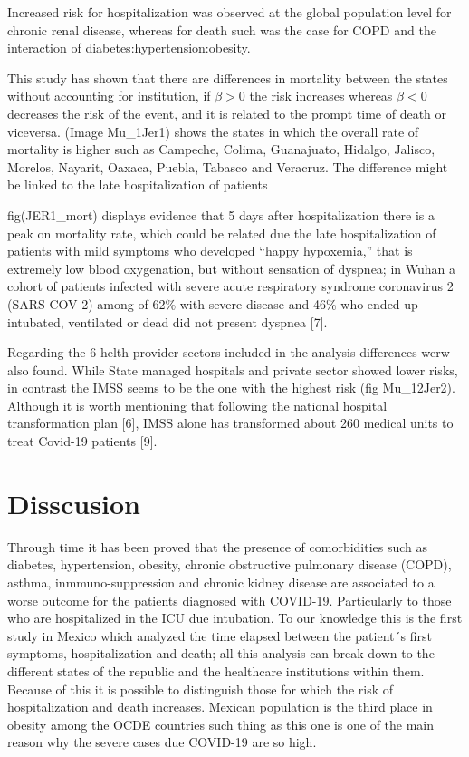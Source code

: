 \documentclass[10pt,letterpaper]{article}
\begin{document}
Increased risk for hospitalization was observed at the global population
level for chronic renal disease, whereas for death such was the case for
COPD and the interaction of diabetes:hypertension:obesity.

This study has shown that there are differences in mortality between the
states without accounting for institution, if \(\beta>0\) the risk
increases whereas \(\beta<0\) decreases the risk of the event, and it is
related to the prompt time of death or viceversa. (Image Mu\_1Jer1)
shows the states in which the overall rate of mortality is higher such
as Campeche, Colima, Guanajuato, Hidalgo, Jalisco, Morelos, Nayarit,
Oaxaca, Puebla, Tabasco and Veracruz. The difference might be linked to
the late hospitalization of patients

fig(JER1\_mort) displays evidence that 5 days after hospitalization
there is a peak on mortality rate, which could be related due the late
hospitalization of patients with mild symptoms who developed ``happy
hypoxemia,'' that is extremely low blood oxygenation, but without
sensation of dyspnea; in Wuhan a cohort of patients infected with severe
acute respiratory syndrome coronavirus 2 (SARS-COV-2) among of 62\% with
severe disease and 46\% who ended up intubated, ventilated or dead did
not present dyspnea {[}7{]}.

Regarding the 6 helth provider sectors included in the analysis
differences werw also found. While State managed hospitals and private
sector showed lower risks, in contrast the IMSS seems to be the one with
the highest risk (fig Mu\_12Jer2). Although it is worth mentioning that
following the national hospital transformation plan {[}6{]}, IMSS alone
has transformed about 260 medical units to treat Covid-19 patients
{[}9{]}.

\hypertarget{disscusion}{%
\section{Disscusion}\label{disscusion}}

Through time it has been proved that the presence of comorbidities such
as diabetes, hypertension, obesity, chronic obstructive pulmonary
disease (COPD), asthma, inmmuno-suppression and chronic kidney disease
are associated to a worse outcome for the patients diagnosed with
COVID-19. Particularly to those who are hospitalized in the ICU due
intubation. To our knowledge this is the first study in Mexico which
analyzed the time elapsed between the patient´s first symptoms,
hospitalization and death; all this analysis can break down to the
different states of the republic and the healthcare institutions within
them. Because of this it is possible to distinguish those for which the
risk of hospitalization and death increases. Mexican population is the
third place in obesity among the OCDE countries such thing as this one
is one of the main reason why the severe cases due COVID-19 are so high.
\end{document}
